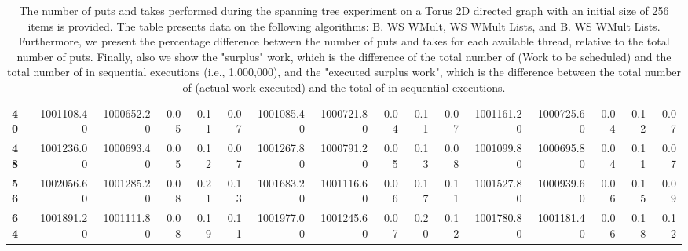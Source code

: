\begin{table}[!ht]
{\begin{tabular}{lrrrrrrrrrrrrrrr}
\textbf{40} &  1001108.40 & 1000652.20 &           0.05 &        0.11 &                 0.07 &     1001085.40 & 1000721.80 &           0.04 &        0.11 &                 0.07 &        1001161.20 & 1000725.60 &           0.04 &        0.12 &                 0.07 \\
\textbf{48} &  1001236.00 & 1000693.40 &           0.05 &        0.12 &                 0.07 &     1001267.80 & 1000791.20 &           0.05 &        0.13 &                 0.08 &        1001099.80 & 1000695.80 &           0.04 &        0.11 &                 0.07 \\
\textbf{56} &  1002056.60 & 1001285.20 &           0.08 &        0.21 &                 0.13 &     1001683.20 & 1001116.60 &           0.06 &        0.17 &                 0.11 &        1001527.80 & 1000939.60 &           0.06 &        0.15 &                 0.09 \\
\textbf{64} &  1001891.20 & 1001111.80 &           0.08 &        0.19 &                 0.11 &     1001977.00 & 1001245.60 &           0.07 &        0.20 &                 0.12 &        1001780.80 & 1001181.40 &           0.06 &        0.18 &                 0.12 \\
\bottomrule
\end{tabular}}
\label{difference-Torus_2D_directed-256-B_WS_NC_MULT_OPT-WS_NC_MULT_LA_OPT-B_WS_NC_MULT_LA_OPT}
\caption{The number of puts and takes performed during the
    spanning tree experiment on a Torus 2D directed graph with an initial size
    of 256 items is provided. The table presents data on the
    following algorithms: B. WS WMult, WS WMult Lists, and
    B. WS WMult Lists. Furthermore, we present the percentage difference
    between the number of puts and takes for each available thread,
    relative to the total number of puts. Finally, also we show the
    "surplus" work, which is the difference of the total number of
    \Puts (Work to be scheduled) and the total number of \Puts in
    sequential executions (i.e., 1,000,000), and the "executed surplus
    work", which is the difference between the total number of \Takes
    (actual work executed) and the total of \Takes in sequential
    executions.}
\end{table}
